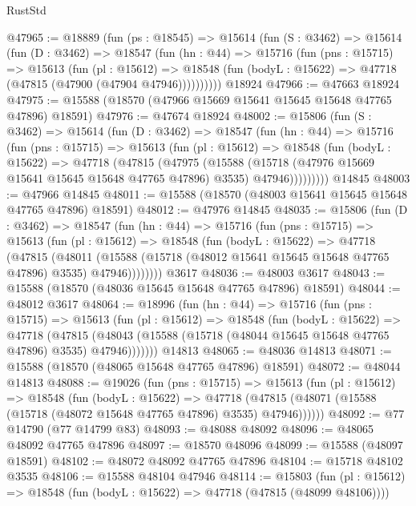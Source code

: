 \begin{lexlean}{RustStd}
\begin{coremodule}
@47965 := @18889
    (fun (ps : @18545) =>
    @15614
      (fun (S : @3462) =>
      @15614
        (fun (D : @3462) =>
        @18547
          (fun (hn : @44) =>
          @15716
            (fun (pns : @15715) =>
            @15613
              (fun (pl : @15612) =>
              @18548 (fun (bodyL : @15622) => @47718 (@47815 (@47900 (@47904 @47946))))))))))
    @18924
@47966 := @47663 @18924
@47975 := @15588 (@18570 (@47966 @15669 @15641 @15645 @15648 @47765 @47896) @18591)
@47976 := @47674 @18924
@48002 := @15806
    (fun (S : @3462) =>
    @15614
      (fun (D : @3462) =>
      @18547
        (fun (hn : @44) =>
        @15716
          (fun (pns : @15715) =>
          @15613
            (fun (pl : @15612) =>
            @18548
              (fun (bodyL : @15622) =>
              @47718
                (@47815
                  (@47975
                    (@15588
                      (@15718 (@47976 @15669 @15641 @15645 @15648 @47765 @47896) @3535)
                      @47946)))))))))
    @14845
@48003 := @47966 @14845
@48011 := @15588 (@18570 (@48003 @15641 @15645 @15648 @47765 @47896) @18591)
@48012 := @47976 @14845
@48035 := @15806
    (fun (D : @3462) =>
    @18547
      (fun (hn : @44) =>
      @15716
        (fun (pns : @15715) =>
        @15613
          (fun (pl : @15612) =>
          @18548
            (fun (bodyL : @15622) =>
            @47718
              (@47815
                (@48011
                  (@15588 (@15718 (@48012 @15641 @15645 @15648 @47765 @47896) @3535) @47946))))))))
    @3617
@48036 := @48003 @3617
@48043 := @15588 (@18570 (@48036 @15645 @15648 @47765 @47896) @18591)
@48044 := @48012 @3617
@48064 := @18996
    (fun (hn : @44) =>
    @15716
      (fun (pns : @15715) =>
      @15613
        (fun (pl : @15612) =>
        @18548
          (fun (bodyL : @15622) =>
          @47718
            (@47815
              (@48043 (@15588 (@15718 (@48044 @15645 @15648 @47765 @47896) @3535) @47946)))))))
    @14813
@48065 := @48036 @14813
@48071 := @15588 (@18570 (@48065 @15648 @47765 @47896) @18591)
@48072 := @48044 @14813
@48088 := @19026
    (fun (pns : @15715) =>
    @15613
      (fun (pl : @15612) =>
      @18548
        (fun (bodyL : @15622) =>
        @47718 (@47815 (@48071 (@15588 (@15718 (@48072 @15648 @47765 @47896) @3535) @47946))))))
@48092 := @77 @14790 (@77 @14799 @83)
@48093 := @48088 @48092
@48096 := @48065 @48092 @47765 @47896
@48097 := @18570 @48096
@48099 := @15588 (@48097 @18591)
@48102 := @48072 @48092 @47765 @47896
@48104 := @15718 @48102 @3535
@48106 := @15588 @48104 @47946
@48114 := @15803
    (fun (pl : @15612) => @18548 (fun (bodyL : @15622) => @47718 (@47815 (@48099 @48106))))

\end{coremodule}
\end{lexlean}

